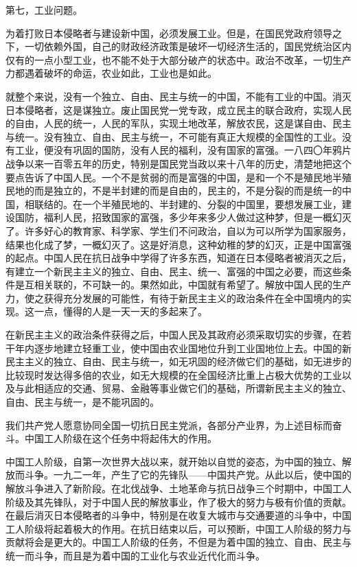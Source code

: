 第七，工业问题。

为着打败日本侵略者与建设新中国，必须发展工业。但是，在国民党政府领导之下，一切依赖外国，自己的财政经济政策是破坏一切经济生活的，国民党统治区内仅有的一点小型工业，也不能不处于大部分破产的状态中。政治不改革，一切生产力都遇着破坏的命运，农业如此，工业也是如此。

就整个来说，没有一个独立、自由、民主与统一的中国，不能有工业的中国。消灭日本侵略者，这是谋独立。废止国民党一党专政，成立民主的联合政府，实现人民的自由，人民的统一，人民的军队，实现土地改革，解放农民，这是谋自由、民主与统一。没有独立、自由、民主与统一，不可能有真正大规模的全国性的工业。没有工业，便没有巩固的国防，没有人民的福利，没有国家的富强。一八四〇年鸦片战争以来一百零五年的历史，特别是国民党当政以来十八年的历史，清楚地把这个要点告诉了中国人民。一个不是贫弱的而是富强的中国，是和一个不是殖民地半殖民地的而是独立的，不是半封建的而是自由的，民主的，不是分裂的而是统一的中国，相联结的。在一个半殖民地的、半封建的、分裂的中国里，要想发展工业，建设国防，福利人民，招致国家的富强，多少年来多少人做过这种梦，但是一概幻灭了。许多好心的教育家、科学家、学生们不问政治，自以为可以所学为国家服务，结果也化成了梦，一概幻灭了。这是好消息，这种幼稚的梦的幻灭，正是中国富强的起点。中国人民在抗日战争中学得了许多东西，知道在日本侵略者被消灭之后，有建立一个新民主主义的独立、自由、民主、统一、富强的中国之必要，而这些条件是互相关联的，不可缺一的。果然如此，中国就有希望了。解放中国人民的生产力，使之获得充分发展的可能性，有待于新民主主义的政治条件在全中国境内的实现。这一点，懂得的人是一天一天的多起来了。

在新民主主义的政治条件获得之后，中国人民及其政府必须采取切实的步骤，在若干年内逐步地建立轻重工业，使中国由农业国地位升到工业国地位上去。中国的新民主主义的独立、自由、民主与统一，如无巩固的经济做它们的基础，如无进步的比较现时发达得多倍的农业，如无大规模的在全国经济比重上占极大优势的工业以及与此相适应的交通、贸易、金融等事业做它们的基础，所谓新民主主义的独立、自由、民主与统一，是不能巩固的。

我们共产党人愿意协同全国一切抗日民主党派，各部分产业界，为上述目标而奋斗。中国工人阶级在这个任务中将起伟大的作用。

中国工人阶级，自第一次世界大战以来，就开始以自觉的姿态，为中国的独立、解放而斗争。一九二一年，产生了它的先锋队——中国共产党。从此以后，使中国的解放斗争进入了新阶段。在北伐战争、土地革命与抗日战争三个时期中，中国工人阶级及其先锋队，对于中国人民的解放事业，作了极大的努力与极有价值的贡献。在最后消灭日本侵略者的斗争中，特别是在收复大城市与交通要道的斗争中，中国工人阶级将起着极大的作用。在抗日结束以后，可以预断，中国工人阶级的努力与贡献将会是更大的。中国工人阶级的任务，不但是为着中国的独立、自由、民主与统一而斗争，而且是为着中国的工业化与农业近代化而斗争。

